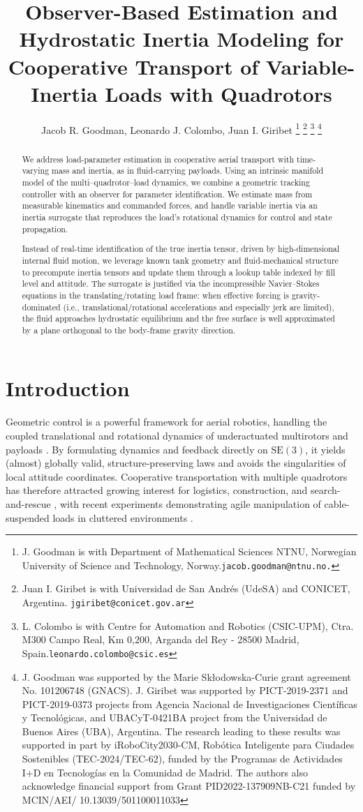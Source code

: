 \documentclass[letterpaper, 10 pt, conference]{ieeeconf}  %
\title{\LARGE \bf
Observer-Based Estimation and Hydrostatic Inertia Modeling for Cooperative Transport of Variable-Inertia Loads with Quadrotors
}
\author{Jacob R. Goodman, Leonardo J. Colombo, Juan I. Giribet%
\thanks{J. Goodman is with Department of Mathematical Sciences NTNU, Norwegian University of Science and Technology, Norway.{\tt\small jacob.goodman@ntnu.no.}}%
\thanks{Juan I. Giribet is with Universidad de San Andr\'es (UdeSA) and CONICET, Argentina.
        {\tt\footnotesize jgiribet@conicet.gov.ar}}     
        \thanks{L. Colombo is with Centre for Automation and Robotics (CSIC-UPM), Ctra. M300 Campo Real, Km 0,200, Arganda
del Rey - 28500 Madrid, Spain.{\tt\small leonardo.colombo@csic.es}}%
\thanks{J. Goodman was supported by the Marie Skłodowska-Curie grant agreement No. 101206748 (GNACS). J. Giribet was supported by PICT-2019-2371 and PICT-2019-0373 projects from Agencia Nacional de Investigaciones Cient\'ificas y Tecnol\'ogicas, and UBACyT-0421BA project from the Universidad de Buenos Aires (UBA), Argentina. The research leading to these results was supported in part by iRoboCity2030-CM, Robótica Inteligente para Ciudades Sostenibles (TEC-2024/TEC-62), funded by the Programas de Actividades I+D en Tecnologías en la Comunidad de Madrid. The authors also acknowledge financial support from Grant PID2022-137909NB-C21 funded by MCIN/AEI/ 10.13039/501100011033}
}
\begin{document}
\maketitle
\thispagestyle{empty}
\pagestyle{empty}




\begin{abstract}
We address load-parameter estimation in cooperative aerial transport with time-varying mass and inertia, as in fluid-carrying payloads. Using an intrinsic manifold model of the multi–quadrotor–load dynamics, we combine a geometric tracking controller with an observer for parameter identification. We estimate mass from measurable kinematics and commanded forces, and handle variable inertia via an inertia surrogate that reproduces the load’s rotational dynamics for control and state propagation.

Instead of real-time identification of the true inertia tensor, driven by high-dimensional internal fluid motion, we leverage known tank geometry and fluid-mechanical structure to precompute inertia tensors and update them through a lookup table indexed by fill level and attitude. The surrogate is justified via the incompressible Navier–Stokes equations in the translating/rotating load frame: when effective forcing is gravity-dominated (i.e., translational/rotational accelerations and especially jerk are limited), the fluid approaches hydrostatic equilibrium and the free surface is well approximated by a plane orthogonal to the body-frame gravity direction. %
\end{abstract}


\section{Introduction}

Geometric control is a powerful framework for aerial robotics, handling the coupled translational and rotational dynamics of underactuated multirotors and payloads \cite{Elastic,Lee-TCST,LeeSrePICDC13}. By formulating dynamics and feedback directly on $\mathrm{SE}(3)$, it yields (almost) globally valid, structure-preserving laws and avoids the singularities of local attitude coordinates. Cooperative transportation with multiple quadrotors has therefore attracted growing interest for logistics, construction, and search-and-rescue \cite{Fink,loiano}, with recent experiments demonstrating agile manipulation of cable-suspended loads in cluttered environments \cite{sun2025agilecoop}.
\end{document}
